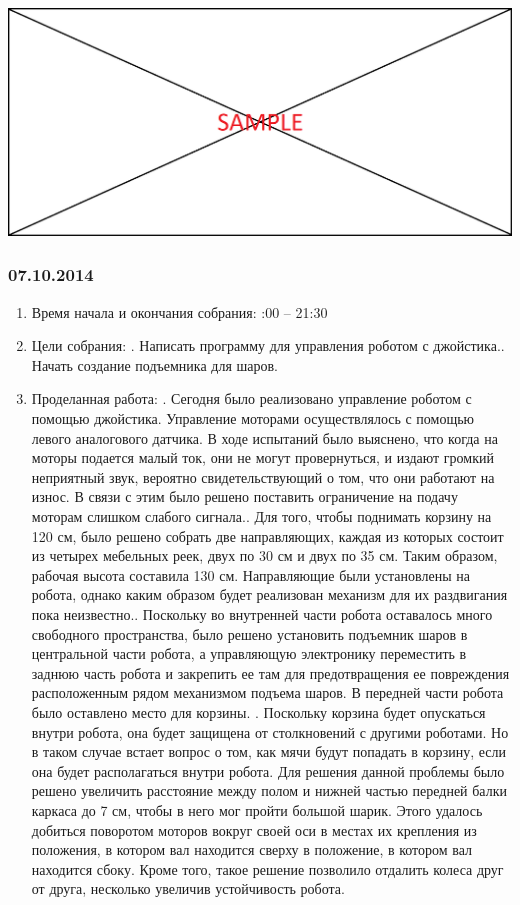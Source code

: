 \documentclass[11pt]{article}
\newcommand\measurepage{\dimexpr\pagegoal-\pagetotal-\baselineskip\relax}
\newcommand\fillpage{\includegraphics[width=\textwidth, height=\measurepage]{img/fill_page}}
\begin{document}
         \fillpage

         \subsubsection{07.10.2014}
         \begin{enumerate}
            \item Время начала и окончания собрания:
            :00 – 21:30
            \item Цели собрания:
            .    Написать программу для управления роботом с джойстика..   Начать создание подъемника для шаров.
            \item Проделанная работа:
            .   Сегодня было реализовано управление роботом с помощью джойстика. Управление моторами осуществлялось с помощью левого аналогового датчика. В ходе испытаний было выяснено, что когда на моторы подается малый ток, они не могут провернуться, и издают громкий неприятный звук, вероятно свидетельствующий о том, что они работают на износ. В связи с этим было решено поставить ограничение на подачу моторам слишком слабого сигнала..   Для того, чтобы поднимать корзину на 120 см, было решено собрать две направляющих, каждая из которых состоит из четырех мебельных реек, двух по 30 см и двух по 35 см. Таким образом, рабочая высота составила 130 см. Направляющие были установлены на робота, однако каким образом будет реализован механизм для их раздвигания пока неизвестно..   Поскольку во внутренней части робота оставалось много свободного пространства, было решено установить подъемник шаров в центральной части робота, а управляющую электронику переместить в заднюю часть робота и закрепить ее там для предотвращения ее повреждения расположенным рядом механизмом подъема шаров. В передней части робота было оставлено место для корзины. .   Поскольку корзина будет опускаться внутри робота, она будет защищена от столкновений с другими роботами. Но в таком случае встает вопрос о том, как мячи будут попадать в корзину, если она будет располагаться внутри робота. Для решения данной проблемы было решено увеличить расстояние между полом и нижней частью передней балки каркаса до 7 см, чтобы в него мог пройти большой шарик. Этого удалось добиться поворотом моторов вокруг своей оси в местах их крепления из положения, в котором вал находится сверху в положение, в котором вал находится сбоку. Кроме того, такое решение позволило отдалить колеса друг от друга, несколько увеличив устойчивость робота.\newline

\end{enumerate}
\end{document}
